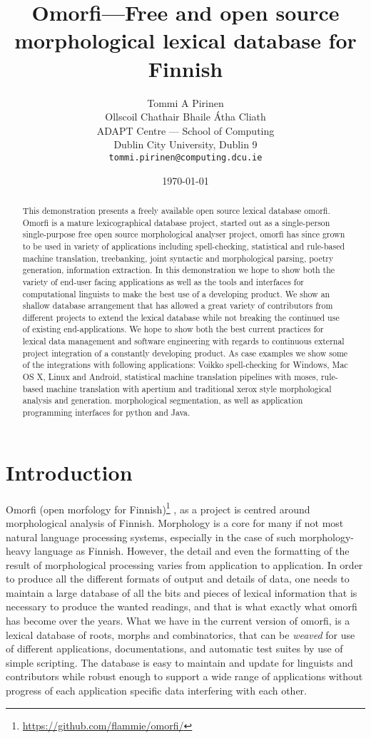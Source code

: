 \documentclass[11pt]{article}
\title{Omorfi---Free and open source morphological lexical database for Finnish}
\author{Tommi A Pirinen \\
  Ollscoil Chathair Bhaile Átha Cliath \\
  ADAPT Centre --- School of Computing \\
  Dublin City University, Dublin 9 \\
  {\tt tommi.pirinen@computing.dcu.ie}  \\}
\date{\today}
\begin{document}
\maketitle
\begin{abstract}
    This demonstration presents a freely available open source lexical database
    omorfi. Omorfi is a mature lexicographical database project, started out as
    a single-person single-purpose free open source morphological analyser
    project, omorfi has since grown to be used in variety of applications
    including spell-checking, statistical and rule-based machine translation,
    treebanking, joint syntactic and morphological parsing, poetry generation,
    information extraction. In this demonstration we hope to show both the
    variety of end-user facing applications as well as the tools and interfaces
    for computational linguists to make the best use of a developing product.
    We show an shallow database arrangement that has allowed a great variety
    of contributors from different projects to extend the lexical database
    while not breaking the continued use of existing end-applications.
    We hope to show both the best current practices for lexical data management
    and software engineering with regards to continuous external project
    integration of a constantly developing product. As case examples we show
    some of the integrations with following applications: Voikko spell-checking
    for Windows, Mac OS X, Linux and Android, statistical machine translation
    pipelines with moses, rule-based machine translation with apertium and
    traditional xerox style morphological analysis and generation. 
    morphological segmentation, as well
    as application programming interfaces for python and Java.
\end{abstract}

\section{Introduction}

Omorfi (open morfology for
Finnish)\footnote{\url{https://github.com/flammie/omorfi/}}
, as a project is centred around morphological
analysis of Finnish. Morphology is a core for many if
not most natural language processing systems,
especially in the case of such morphology-heavy
language as Finnish.  However, the detail and even
the formatting of the result of morphological
processing varies from application to application.
In order to produce all the different formats of
output and details of data, one needs to maintain a
large database of all the bits and pieces of lexical
information that is necessary to produce the wanted
readings, and that is what exactly what omorfi has
become over the years. What we have in the current
version of omorfi, is a lexical database of roots,
morphs and combinatorics, that can be \emph{weaved}
for use of different applications, documentations,
and automatic test suites by use of simple scripting.
The database is easy to maintain and update for
linguists and contributors while robust enough to
support a wide range of applications without progress
of each application specific data interfering with
each other.
\end{document}
